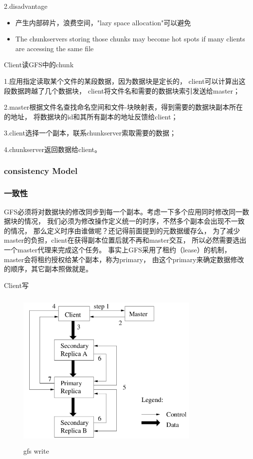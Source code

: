 2.disadvantage
\begin{itemize}
  \item 产生内部碎片，浪费空间，"lazy space allocation"可以避免
  \item The chunkservers storing those chunks may become hot spots if many clients are accessing the same file
\end{itemize}


Client读GFS中的chunk

1.应用指定读取某个文件的某段数据，因为数据块是定长的，
client可以计算出这段数据跨越了几个数据块，
client将文件名和需要的数据块索引发送给master；

2.master根据文件名查找命名空间和文件-块映射表，得到需要的数据块副本所在的地址，
将数据块的id和其所有副本的地址反馈给client；

3.client选择一个副本，联系chunkserver索取需要的数据；

4.chunkserver返回数据给client。

\subsubsection{consistency Model}
\subsubsection{一致性}
GFS必须将对数据块的修改同步到每一个副本。考虑一下多个应用同时修改同一数据块的情况，
我们必须为修改操作定义统一的时序，不然多个副本会出现不一致的情况，
那么定义时序由谁做呢？还记得前面提到的元数据缓存么，
为了减少master的负担，client在获得副本位置后就不再和master交互，
所以必然需要选出一个master代理来完成这个任务。
事实上GFS采用了租约（lease）的机制，master会将租约授权给某个副本，称为primary，
由这个primary来确定数据修改的顺序，其它副本照做就是。

Client写
\begin{figure}[!ht]
    \centering
    \includegraphics[height=8cm,width= 9cm]{img/gfs_write.png}
    \caption{gfs write}
\label{gfs_write}
\end{figure}

